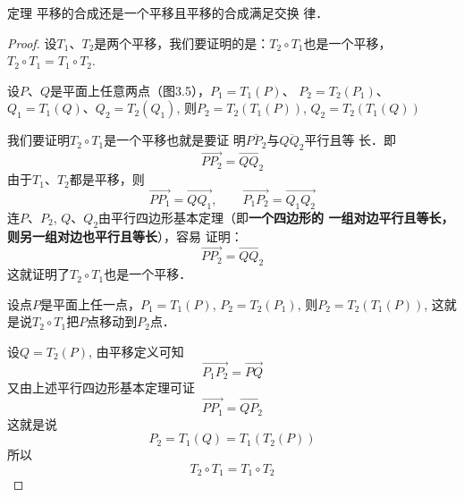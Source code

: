 \begin{blk}{定理}
    平移的合成还是一个平移且平移的合成满足交换
律．
\end{blk}

\begin{proof}
设$T_1$、$T_2$是两个平移，我们要证明的是：$T_2\circ T_1$也是一个平移，$T_2\circ T_1=T_1\circ T_2$.

设$P$、$Q$是平面上任意两点（图3.5），$P_1=T_1(P)$、
$P_2=T_2(P_1)$、$Q_1=T_1(Q)$、$Q_2=T_2(Q_1)$, 则$P_2=T_2(T_1(P))$, $Q_2=T_2(T_1(Q))$
\begin{figure}[htp]
    \centering
{}
    \caption{}
\end{figure}

我们要证明$T_2\circ T_1$是一个平移也就是要证
明$\overline{PP_2}$与$\overline{QQ_2}$平行且等
长．即
\[\Vec{PP_2}=\Vec{QQ_2}\]
由于$T_1$、$T_2$都是平移，则
\[\Vec{PP_1}=\Vec{QQ_1},\qquad \Vec{P_1P_2}=\Vec{Q_1Q_2}\]
连$P$、$P_2$, $Q$、$Q_2$由平行四边形基本定理（即\textbf{一个四边形的
一组对边平行且等长，则另一组对边也平行且等长}），容易
证明：
\[\Vec{PP_2}=\Vec{QQ_2}\]
这就证明了$T_2\circ T_1$也是一个平移．



设点$P$是平面上任一点，$P_1=T_1(P)$, $P_2=T_2(P_1)$,
则$P_2=T_2(T_1(P))$, 这就是说$T_2\circ T_1$把$P$点移动到$P_2$点．

设$Q=T_2(P)$, 由平移定义可知
\[\Vec{P_1P_2}=\Vec{PQ}\]
又由上述平行四边形基本定理可证
\[\Vec{PP_1}=\Vec{QP_2}\]
这就是说
\[P_2=T_1(Q)=T_1(T_2(P))\]
所以
\[T_2\circ T_1=T_1\circ T_2\]
\end{proof}


